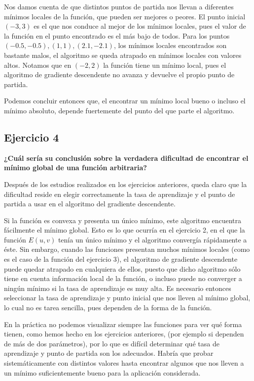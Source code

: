 \documentclass[a4]{article}
\begin{document}
\vspace{-5mm}
Nos damos cuenta de que  distintos puntos de partida nos llevan a diferentes mínimos locales de la función, que pueden ser mejores o peores. 
El punto inicial $(-3,3)$ es el que nos conduce al mejor de los mínimos locales, pues el valor de la función en el punto encontrado es el más bajo de todos. Para los puntos $(-0.5,-0.5),(1,1),(2.1,-2.1)$, los mínimos locales encontrados son bastante malos, el algoritmo se queda atrapado en mínimos locales con valores altos. Notamos que en $(-2,2)$ la función tiene un mínimo local, pues el algoritmo de gradiente descendente no avanza y devuelve el propio punto de partida.

Podemos concluir entonces que, el encontrar un mínimo local bueno o incluso el mínimo absoluto, depende fuertemente del punto del que parte el algoritmo. 

\subsection{Ejercicio 4}
\textbf{¿Cuál sería su conclusión sobre la verdadera dificultad de encontrar el mínimo
global de una función arbitraria?}

Después de los estudios realizados en los ejercicios anteriores, queda claro que la dificultad reside en elegir correctamente la tasa de aprendizaje y el punto de partida a usar en el algoritmo del gradiente descendente. 

Si la función es convexa y presenta un único mínimo, este algoritmo encuentra fácilmente el mínimo global. Esto es lo que ocurría en el ejercicio 2, en el que la función $E(u,v)$ tenía un único mínimo y el algoritmo convergía rápidamente a éste. Sin embargo, cuando las funciones presentan muchos mínimos locales (como es el caso de la función del ejercicio 3), el algoritmo de gradiente descendente puede quedar atrapado en cualquiera de ellos, puesto que dicho algoritmo sólo tiene en cuenta información local de la función, o incluso puede no converger a ningún mínimo si la tasa de aprendizaje es muy alta. Es necesario entonces seleccionar la tasa de aprendizaje y punto inicial que nos lleven al mínimo global, lo cual no es tarea sencilla, pues dependen de la forma de la función.

En la práctica no podemos visualizar siempre las funciones para ver qué forma tienen, como hemos hecho en los ejercicios anteriores, (por ejemplo si dependen de más de dos parámetros), por lo que es difícil determinar qué tasa de aprendizaje y punto de partida son los adecuados. Habría que probar sistemáticamente con distintos valores hasta encontrar algunos que nos lleven a un mínimo suficientemente bueno para la aplicación considerada. 
\newpage
\end{document}
